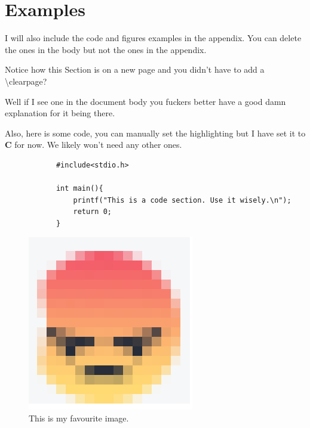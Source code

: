 \documentclass{article}
\newcommand{\newpar}{\vspace{5mm}\noindent}
\begin{document}
    \appendix

    \section{Examples}
        I will also include the code and figures examples in the appendix. You can delete the ones in the body but not the ones in the appendix.
        
        \newpar Notice how this Section is on a new page and you didn't have to add a \textbackslash clearpage?

        \newpar Well if I see one in the document body you fuckers better have a good damn explanation for it being there.

        \newpar Also, here is some code, you can manually set the highlighting but I have set it to \textbf{C} for now. We likely won't need any other ones.
    
        \begin{lstlisting}
            #include<stdio.h>

            int main(){
                printf("This is a code section. Use it wisely.\n");
                return 0;
            }
        \end{lstlisting}

        \begin{figure}[H]
            \centering
            \includegraphics[width=0.4\linewidth]{angery.png}
            \caption{This is my favourite image.}
            \label{fig:angery1}
        \end{figure}
\end{document}
